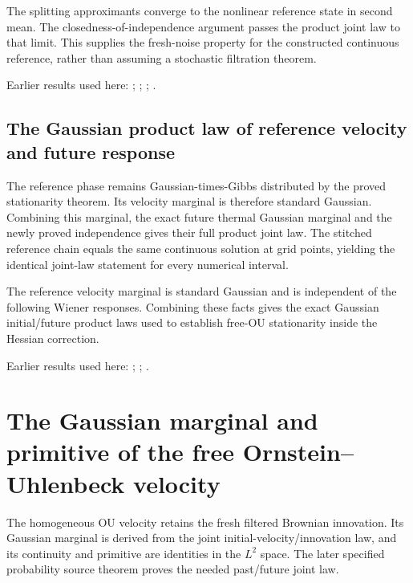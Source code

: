 \documentclass[11pt,a4paper]{report}
\begin{document}
The splitting approximants converge to the nonlinear reference state in second mean. The closedness-of-independence argument passes the product joint law to that limit. This supplies the fresh-noise property for the constructed continuous reference, rather than assuming a stochastic filtration theorem.



Earlier results used here: \cite[Section~3.13.2]{LangevinLean2026ULASC}; \cite[Section~3.13.5]{LangevinLean2026ULASC}; \cite[Section~3.17.1]{LangevinLean2026ULASC}; \cite[Section~3.8.17]{LangevinLean2026ULASC}.
\subsection{\texorpdfstring{The Gaussian product law of reference velocity and future response}{The Gaussian product law of reference velocity and future response}}
\label{report-step-KineticLangevin-CanonicalPastFuture-lean-5}


The reference phase remains Gaussian-times-Gibbs distributed by the proved stationarity theorem. Its velocity marginal is therefore standard Gaussian. Combining this marginal, the exact future thermal Gaussian marginal and the newly proved independence gives their full product joint law. The stitched reference chain equals the same continuous solution at grid points, yielding the identical joint-law statement for every numerical interval.



The reference velocity marginal is standard Gaussian and is independent of the following Wiener responses. Combining these facts gives the exact Gaussian initial/\allowbreak{}future product laws used to establish free-OU stationarity inside the Hessian correction.



Earlier results used here: \cite[Section~3.17.1]{LangevinLean2026ULASC}; \cite[Section~3.26.13]{LangevinLean2026ULASC}; \cite[Section~3.26.3]{LangevinLean2026ULASC}.
\section{\texorpdfstring{The Gaussian marginal and primitive of the free Ornstein–Uhlenbeck velocity}{The Gaussian marginal and primitive of the free Ornstein–Uhlenbeck velocity}}
\label{proof-module-KineticLangevin-FreeOU-lean}


The homogeneous OU velocity retains the fresh filtered Brownian innovation. Its Gaussian marginal is derived from the joint initial-velocity/\allowbreak{}innovation law, and its continuity and primitive are identities in the \(L^{2}\) space. The later specified probability source theorem proves the needed past/\allowbreak{}future joint law.
\end{document}
